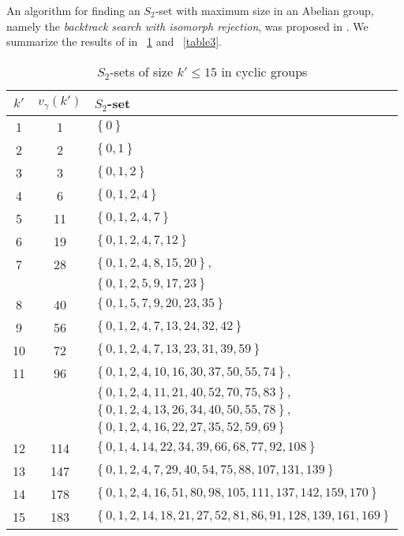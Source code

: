 \documentclass[journal,draftclsnofoot,onecolumn,12pt,twoside]{IEEEtran}
\begin{document}
An algorithm for finding an $S_2$-set with maximum size in an Abelian group, namely the \emph{backtrack search with isomorph rejection}, was proposed in \cite{18,19}. We summarize  the results of \cite{18,19} in \tablename~\ref{table2} and \tablename~\ref{table3}.
\begin{table}[ht]
\small
\caption{$S_2$-sets of size  $k'\leq 15$ in cyclic groups}
\centering
\begin{tabular}{c|c|l}
\hline
$k'$  & $v_{\gamma}(k')$ & $S_2$-set\\
  \hline
  \hline
1 & 1 & $\left\lbrace 0\right\rbrace$ \\
2 & 2 & $\left\lbrace 0, 1\right\rbrace$ \\
3 & 3  &$\left\lbrace 0, 1, 2\right\rbrace$ \\
4 & 6  & $\left\lbrace 0, 1, 2, 4\right\rbrace$\\
5 & 11 & $\left\lbrace 0, 1, 2,4, 7\right\rbrace$ \\
6 & 19 & $\left\lbrace 0, 1, 2, 4, 7, 12\right\rbrace$ \\
7 & 28 & $\left\lbrace 0, 1,2, 4, 8,15, 20\right\rbrace,$ \\
 & & $ \left\lbrace 0, 1, 2, 5, 9, 17, 23\right\rbrace$ \\
8 & 40 & $\left\lbrace 0, 1, 5, 7, 9, 20, 23, 35\right\rbrace$\\
9 & 56 &$ \left\lbrace 0, 1, 2, 4, 7, 13, 24, 32, 42\right\rbrace$ \\
10 & 72  & $\left\lbrace 0, 1, 2, 4, 7, 13, 23, 31, 39, 59\right\rbrace$ \\
11 & 96  & $\left\lbrace 0, 1, 2, 4, 10, 16, 30, 37, 50, 55, 74\right\rbrace,$ \\
& & $\left\lbrace 0, 1, 2, 4, 11, 21, 40, 52, 70, 75, 83\right\rbrace,$\\
& & $\left\lbrace 0, 1, 2, 4, 13, 26, 34, 40, 50, 55, 78\right\rbrace,$\\
& & $\left\lbrace 0, 1, 2, 4, 16, 22, 27, 35, 52, 59, 69\right\rbrace$ \\

12 & 114 & $\left\lbrace 0, 1, 4, 14, 22, 34, 39, 66, 68, 77, 92, 108\right\rbrace$ \\
13 & 147 &  $\left\lbrace 0, 1 ,2, 4, 7, 29, 40, 54, 75, 88, 107, 131, 139\right\rbrace$ \\
14  & 178 & $ \left\lbrace 0, 1, 2, 4, 16, 51, 80, 98, 105, 111, 137, 142, 159, 170\right\rbrace$\\
15 & 183 & $\left\lbrace 0, 1, 2, 14 ,18, 21, 27, 52, 81, 86, 91, 128, 139, 161, 169\right\rbrace$ \\
\hline
 \end{tabular}
 \label{table2}
 \end{table}
\end{document}
